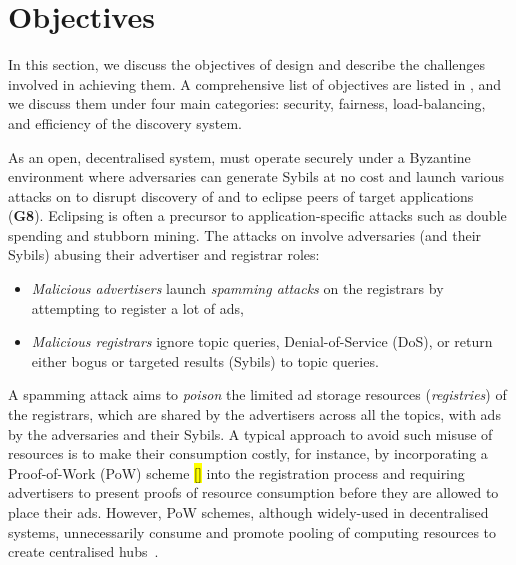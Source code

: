 \section{Objectives}
\label{sec:objectives}

In this section, we discuss the objectives of \sysname design and describe the challenges involved in achieving them. A comprehensive list of objectives are listed in , and we discuss them under four main categories: security, fairness, load-balancing, and efficiency of the discovery system. 

 As an open, decentralised system, \sysname must operate securely under a Byzantine environment where adversaries can generate Sybils at no cost and launch various attacks on \sysname to disrupt discovery of and to eclipse peers of target applications (\textbf{G8}). Eclipsing is often a precursor to application-specific attacks such as double spending and stubborn mining. The attacks on \sysname involve adversaries (and their Sybils) abusing their advertiser and registrar roles: 


\begin{itemize}
 \item \textit{Malicious advertisers} launch \textit{spamming attacks} on the registrars by attempting to register a lot of ads, 
 \item \textit{Malicious registrars} ignore topic queries, \ie Denial-of-Service (DoS), or return either bogus or targeted results (\eg  Sybils) to topic queries.
\end{itemize}

A spamming attack aims to \textit{poison} the limited ad storage resources (\ie \textit{registries}) of the registrars, which are shared by the advertisers across all the topics, with ads by the adversaries and their Sybils. A typical approach to avoid such misuse of resources is to make their consumption costly, for instance, by incorporating a Proof-of-Work (PoW) scheme \hl{[]} into the registration process and requiring advertisers to present proofs of resource consumption before they are allowed to place their ads. However, PoW schemes, although widely-used in decentralised systems, unnecessarily consume and promote pooling of computing resources to create centralised hubs~\cite{gervais2014bitcoin}. 

